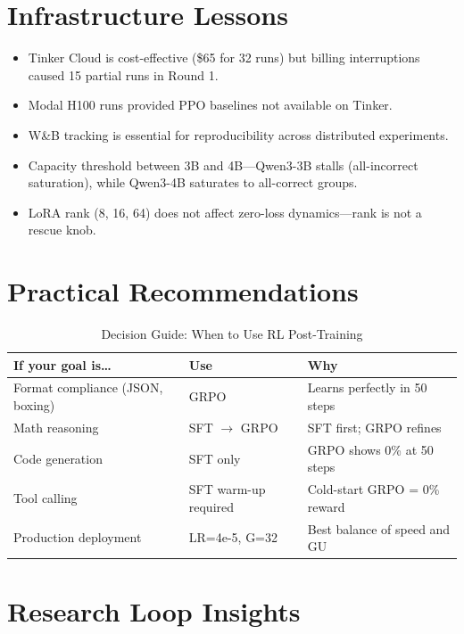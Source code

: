 \documentclass[12pt,a4paper]{report}
\theoremstyle{definition}
\begin{document}
\section{Infrastructure Lessons}
\label{sec:infra-lessons}

\begin{itemize}[nosep]
\item Tinker Cloud is cost-effective (\$65 for 32 runs) but billing interruptions caused 15 partial runs in Round 1.
\item Modal H100 runs provided PPO baselines not available on Tinker.
\item W\&B tracking is essential for reproducibility across distributed experiments.
\item Capacity threshold between 3B and 4B---Qwen3-3B stalls (all-incorrect saturation), while Qwen3-4B saturates to all-correct groups.
\item LoRA rank (8, 16, 64) does not affect zero-loss dynamics---rank is not a rescue knob.
\end{itemize}

\section{Practical Recommendations}
\label{sec:recommendations}

\begin{table}[htbp]
\centering
\caption{Decision Guide: When to Use RL Post-Training}
\label{tab:decision-guide}
\begin{tabular}{p{4cm}p{4cm}p{5cm}}
\toprule
\textbf{If your goal is\ldots} & \textbf{Use} & \textbf{Why} \\
\midrule
Format compliance (JSON, boxing) & GRPO & Learns perfectly in 50 steps \\
Math reasoning & SFT $\to$ GRPO & SFT first; GRPO refines \\
Code generation & SFT only & GRPO shows 0\% at 50 steps \\
Tool calling & SFT warm-up required & Cold-start GRPO = 0\% reward \\
Production deployment & LR=4e-5, G=32 & Best balance of speed and GU \\
\bottomrule
\end{tabular}
\end{table}

\section{Research Loop Insights}
\label{sec:research-loop}
\end{document}
